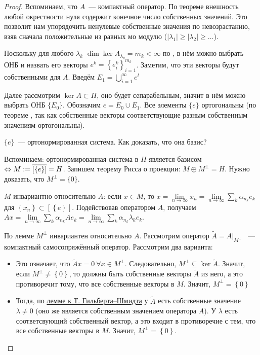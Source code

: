 \begin{proof}
    Вспоминаем, что $A$~--- компактный оператор. По теореме  внешность любой окрестности нуля содержит конечное число собственных значений. Это позволит нам упорядочить ненулевые собственные значения по невозрастанию, взяв сначала положительные из равных мо модулю (\(|\lambda_1| \geqslant |\lambda_2| \geq \ldots \)).

    Поскольку для любого $\lambda_k$ $\dim \ker A_{\lambda_k} = m_k < \infty$ по , в нём можно выбрать ОНБ и назвать его векторы $e^k = \left\{ e_i^k \right\}_{i=1}^{m_k}$. Заметим, что эти векторы будут собственными для $A$. Введём $E_1 = \bigcup\limits_{i=1}^\infty e^l$

    Далее рассмотрим $\ker A \subset H$, оно будет сепарабельным, значит в нём можно выбрать ОНБ $\{ E_0 \}$. Обозначим $e = E_0 \cup E_1$.  Все элементы $\{e\}$ ортогональны (по теореме , так как собственные векторы соответствующие разным собственным значениям ортогональны).

    $\{e\}$~--- ортонормированная система. Как доказать, что она базис?

    Вспоминаем: ортонормированная система в $H$ является базисом $\Leftrightarrow M:=\overline{[\{e\}]}=H$.
    Запишем теорему Рисса о проекции: $M \oplus M^\perp = H$. Нужно доказать, что $M^\perp = \{0\}$.

    $M$ инвариантно относительно $A$: если $x \in M$, то $x = \lim\limits_{n \rightarrow \infty} x_n =  \lim \limits_{n \rightarrow \infty} \sum \limits_k \alpha_{n_k} e_k$ для $\left\{ x_n \right\} \subset [\left\{e \right\}]$. Подействовав оператором $A$, получаем $Ax = \lim \limits_{n \rightarrow \infty} \sum \limits_k \alpha_{n_k} A e_k = \lim \limits_{n \rightarrow \infty} \sum\limits_{k}\alpha_{n_k}\lambda_k e_k$.

    По лемме  $M^\perp$ инвариантен относительно $A$.
    Рассмотрим оператор $\tilde{A} = \left. A \right|_{M^\perp}$
    ~--- компактный самосопряжённый оператор. Рассмотрим два варианта:
    \begin{itemize}
        \item[\(\tilde{A} = 0\)]
        Это означает, что $\tilde{A} x = 0 \: \forall x \in M^\perp$. Следовательно, 
        $M^\perp \subseteq \ker \tilde{A}$. Значит, если $M^\perp \neq \left\{0 \right\}$, то должны быть собственные векторы $\tilde{A}$ из него, а это противоречит тому, что все собственные векторы в $M$. Значит, $M^\perp = \left\{0 \right\}$
        \item[\(\tilde{A} \neq 0\)]
        Тогда, по \hyperref[hilbert-smidt:lemma]{лемме к Т. Гильберта--Шмидта} у $\tilde{A}$ есть собственные значение $\lambda \neq 0$ (оно же является собственным значением оператора $A$). У $\lambda$ есть соответсвующий собственный вектор, а это входит в противоречие с тем, что все собственные векторы в $M$. Значит, $M^\perp = \left\{0 \right\}$.
    \end{itemize}
\end{proof}